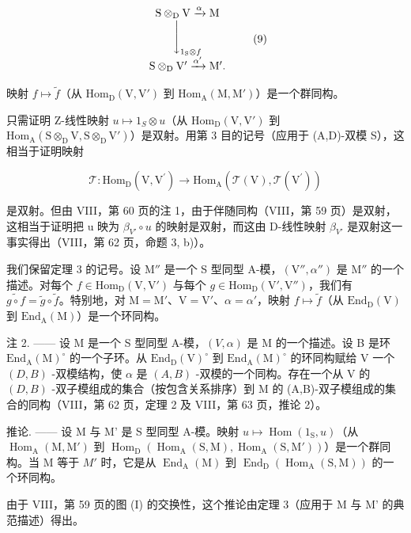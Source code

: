 \[
\begin{array}{c} \mathrm{S} \otimes_ {\mathrm{D}} \mathrm{V} \xrightarrow {\alpha} \mathrm{M} \\ \Biggl \downarrow_ {1 _ {\mathrm{S}} \otimes f} \\ \mathrm{S} \otimes_ {\mathrm{D}} \mathrm{V} ^ {\prime} \xrightarrow {\alpha^ {\prime}} \mathrm{M} ^ {\prime}. \end{array}\tag{9}
\]

映射 \(f \mapsto \widetilde{f}\)（从 \(\mathrm{Hom}_{\mathrm{D}}(\mathrm{V},\mathrm{V}')\) 到 \(\mathrm{Hom}_{\mathrm{A}}(\mathrm{M},\mathrm{M}')\)）是一个群同构。

只需证明 Z-线性映射 \(u \mapsto 1_{S} \otimes u\)（从 \(\mathrm{Hom}_{\mathrm{D}}(\mathrm{V}, \mathrm{V}')\) 到 \(\mathrm{Hom}_{\mathrm{A}}(\mathrm{S} \otimes_{\mathrm{D}} \mathrm{V}, \mathrm{S} \otimes_{\mathrm{D}} \mathrm{V}')\)）是双射。用第 3 目的记号（应用于 (A,D)-双模 S），这相当于证明映射

\[
\mathcal {T}: \mathrm{Hom} _ {\mathrm{D}} (\mathrm{V}, \mathrm{V} ^ {\prime}) \longrightarrow \mathrm{Hom} _ {\mathrm{A}} (\mathcal {T} (\mathrm{V}), \mathcal {T} (\mathrm{V} ^ {\prime}))
\]

是双射。但由 VIII，第 60 页的注 1，由于伴随同构（VIII，第 59 页）是双射，这相当于证明把 u 映为 \(\beta_{V'} \circ u\) 的映射是双射，而这由 D-线性映射 \(\beta_{V'}\) 是双射这一事实得出（VIII，第 62 页，命题 3, b)）。

我们保留定理 3 的记号。设 \(\mathrm{M}''\) 是一个 S 型同型 A-模，\((\mathrm{V}'',\alpha '')\) 是 \(\mathrm{M}''\) 的一个描述。对每个 \(f\in \mathrm{Hom}_{\mathrm{D}}(\mathrm{V},\mathrm{V}')\) 与每个 \(g\in \mathrm{Hom}_{\mathrm{D}}(\mathrm{V}',\mathrm{V}'')\)，我们有 \(\widetilde{g\circ f} = \widetilde{g}\circ \widetilde{f}\)。特别地，对 \(\mathrm{M} = \mathrm{M}'\)、\(\mathrm{V} = \mathrm{V}'\)、\(\alpha = \alpha '\)，映射 \(f\mapsto \widetilde{f}\)（从 \(\mathrm{End}_{\mathrm{D}}(\mathrm{V})\) 到 \(\mathrm{End}_{\mathrm{A}}(\mathrm{M})\)）是一个环同构。

注 2. —— 设 M 是一个 S 型同型 A-模，\((V,\alpha)\) 是 M 的一个描述。设 B 是环 \(\mathrm{End}_{\mathrm{A}}(\mathrm{M})^{\circ}\) 的一个子环。从 \(\mathrm{End}_{\mathrm{D}}(\mathrm{V})^{\circ}\) 到 \(\mathrm{End}_{\mathrm{A}}(\mathrm{M})^{\circ}\) 的环同构赋给 V 一个 \((D,B)\) -双模结构，使 \(\alpha\) 是 \((A,B)\) -双模的一个同构。存在一个从 V 的 \((D,B)\) -双子模组成的集合（按包含关系排序）到 M 的 (A,B)-双子模组成的集合的同构（VIII，第 62 页，定理 2 及 VIII，第 63 页，推论 2）。

推论. —— 设 M 与 M' 是 S 型同型 A-模。映射 \(u \mapsto \operatorname{Hom}(1_{\mathrm{S}}, u)\)（从 \(\operatorname{Hom}_{\mathrm{A}}(\mathrm{M}, \mathrm{M}')\) 到 \(\operatorname{Hom}_{\mathrm{D}}(\operatorname{Hom}_{\mathrm{A}}(\mathrm{S}, \mathrm{M}), \operatorname{Hom}_{\mathrm{A}}(\mathrm{S}, \mathrm{M}'))\)）是一个群同构。当 M 等于 \(M'\) 时，它是从 \(\operatorname{End}_{\mathrm{A}}(\mathrm{M})\) 到 \(\operatorname{End}_{\mathrm{D}}(\operatorname{Hom}_{\mathrm{A}}(\mathrm{S}, \mathrm{M}))\) 的一个环同构。

由于 VIII，第 59 页的图 (I) 的交换性，这个推论由定理 3（应用于 M 与 M' 的典范描述）得出。
